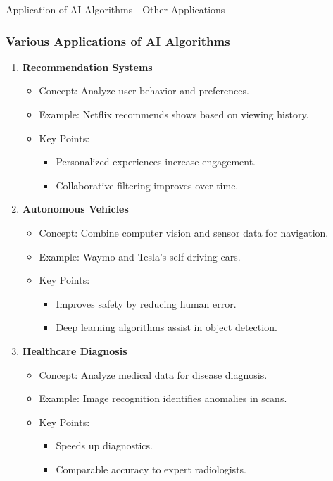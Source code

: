 \documentclass[aspectratio=169]{beamer}
\begin{document}
\begin{frame}[fragile]{Application of AI Algorithms - Other Applications}
    \frametitle{Various Applications of AI Algorithms}
    \begin{enumerate}
        \item \textbf{Recommendation Systems}
        \begin{itemize}
            \item Concept: Analyze user behavior and preferences.
            \item Example: Netflix recommends shows based on viewing history.
            \item Key Points:
            \begin{itemize}
                \item Personalized experiences increase engagement.
                \item Collaborative filtering improves over time.
            \end{itemize}
        \end{itemize}
        
        \item \textbf{Autonomous Vehicles}
        \begin{itemize}
            \item Concept: Combine computer vision and sensor data for navigation.
            \item Example: Waymo and Tesla's self-driving cars.
            \item Key Points:
            \begin{itemize}
                \item Improves safety by reducing human error.
                \item Deep learning algorithms assist in object detection.
            \end{itemize}
        \end{itemize}

        \item \textbf{Healthcare Diagnosis}
        \begin{itemize}
            \item Concept: Analyze medical data for disease diagnosis.
            \item Example: Image recognition identifies anomalies in scans.
            \item Key Points:
            \begin{itemize}
                \item Speeds up diagnostics.
                \item Comparable accuracy to expert radiologists.
            \end{itemize}
        \end{itemize}
        

\end{enumerate}
\end{frame}
\end{document}
